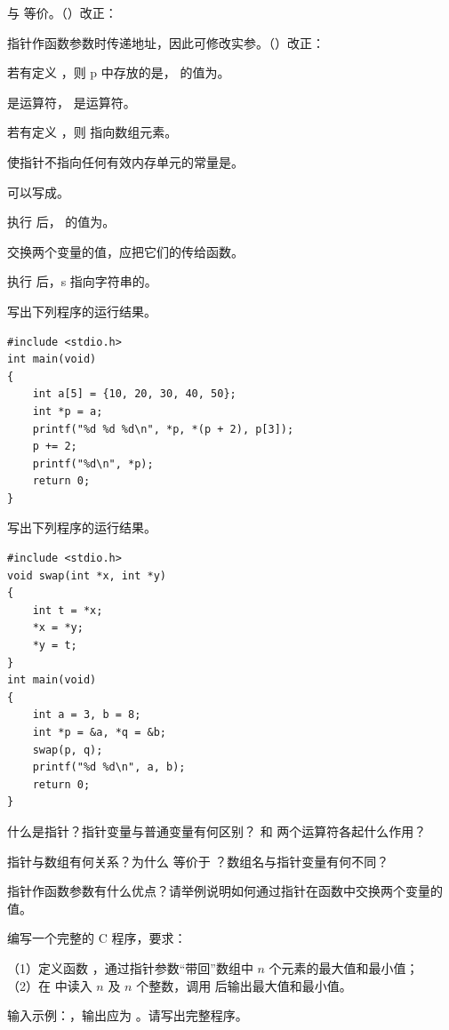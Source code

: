 \documentclass[a4paper,11pt]{article}
\begin{document}
\q {} 与  等价。\quad（\quad）\quad 改正：\fixblank

\q 指针作函数参数时传递地址，因此可修改实参。\quad（\quad）\quad 改正：\fixblank

\q 若有定义 ，则 p 中存放的是\fillblanks[2.0cm]， 的值为\fillblank{}。

\q \code{\&} 是\fillblanks[1.6cm]运算符，\code{*} 是\fillblanks[1.8cm]运算符。

\q 若有定义 ，则  指向数组元素\fillblanks[1.2cm]。

\q 使指针不指向任何有效内存单元的常量是\fillblanks[1.4cm]。

\q {} 可以写成\fillblanks[1.6cm]。

\q 执行  后， 的值为\fillblank{}。

\q 交换两个变量的值，应把它们的\fillblanks[1.2cm]传给函数。

\q 执行  后，s 指向字符串的\fillblanks[1.8cm]。

\q 写出下列程序的运行结果。
\begin{lstlisting}[language={[custom]C}]
#include <stdio.h>
int main(void)
{
    int a[5] = {10, 20, 30, 40, 50};
    int *p = a;
    printf("%d %d %d\n", *p, *(p + 2), p[3]);
    p += 2;
    printf("%d\n", *p);
    return 0;
}
\end{lstlisting}
\anslines{2.4cm}

\q 写出下列程序的运行结果。
\begin{lstlisting}[language={[custom]C}]
#include <stdio.h>
void swap(int *x, int *y)
{
    int t = *x;
    *x = *y;
    *y = t;
}
int main(void)
{
    int a = 3, b = 8;
    int *p = &a, *q = &b;
    swap(p, q);
    printf("%d %d\n", a, b);
    return 0;
}
\end{lstlisting}
\anslines{2.6cm}

\q 什么是指针？指针变量与普通变量有何区别？\code{\&} 和 \code{*} 两个运算符各起什么作用？\anslines{3.2cm}

\q 指针与数组有何关系？为什么  等价于 ？数组名与指针变量有何不同？\anslines{3.4cm}

\q 指针作函数参数有什么优点？请举例说明如何通过指针在函数中交换两个变量的值。\anslines{3.2cm}

\newpage
{}
\q 编写一个完整的 C 程序，要求：
\par\vspace{0.15em}
\noindent（1）定义函数 ，通过指针参数“带回”数组中 $n$ 个元素的最大值和最小值；\\
\noindent（2）在  中读入 $n$ 及 $n$ 个整数，调用  后输出最大值和最小值。

\noindent 输入示例：，输出应为 。请写出完整程序。\anslines{4.0cm}
\end{document}

